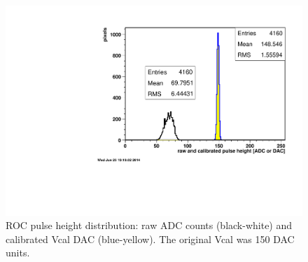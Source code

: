 \documentclass[english]{article}
\begin{document}
%
\begin{figure}
\includegraphics[scale=0.5]{c300-phdist}\caption{ROC pulse height distribution: raw ADC counts (black-white) and calibrated
Vcal DAC (blue-yellow). The original Vcal was 150 DAC units.}
%
\end{figure}
\end{document}
